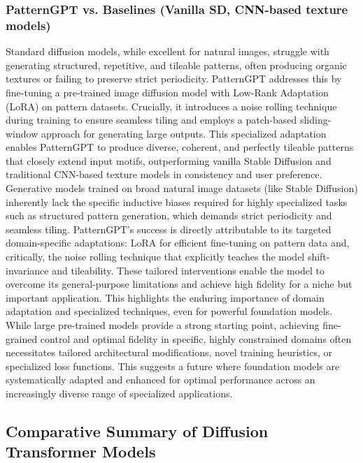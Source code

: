 \documentclass[a4paper]{article}
\begin{document}
\subsubsection*{PatternGPT vs. Baselines (Vanilla SD, CNN-based texture models)}
Standard diffusion models, while excellent for natural images, struggle with generating structured, repetitive, and tileable patterns, often producing organic textures or failing to preserve strict periodicity. PatternGPT \cite{Riso2024StructuredPattern} addresses this by fine-tuning a pre-trained image diffusion model with Low-Rank Adaptation (LoRA) on pattern datasets. Crucially, it introduces a noise rolling technique during training to ensure seamless tiling and employs a patch-based sliding-window approach for generating large outputs. This specialized adaptation enables PatternGPT to produce diverse, coherent, and perfectly tileable patterns that closely extend input motifs, outperforming vanilla Stable Diffusion and traditional CNN-based texture models in consistency and user preference. Generative models trained on broad natural image datasets (like Stable Diffusion) inherently lack the specific inductive biases required for highly specialized tasks such as structured pattern generation, which demands strict periodicity and seamless tiling. PatternGPT's success is directly attributable to its targeted domain-specific adaptations: LoRA for efficient fine-tuning on pattern data and, critically, the noise rolling technique that explicitly teaches the model shift-invariance and tileability. These tailored interventions enable the model to overcome its general-purpose limitations and achieve high fidelity for a niche but important application. This highlights the enduring importance of domain adaptation and specialized techniques, even for powerful foundation models. While large pre-trained models provide a strong starting point, achieving fine-grained control and optimal fidelity in specific, highly constrained domains often necessitates tailored architectural modifications, novel training heuristics, or specialized loss functions. This suggests a future where foundation models are systematically adapted and enhanced for optimal performance across an increasingly diverse range of specialized applications.

\subsection*{Comparative Summary of Diffusion Transformer Models}
\end{document}
